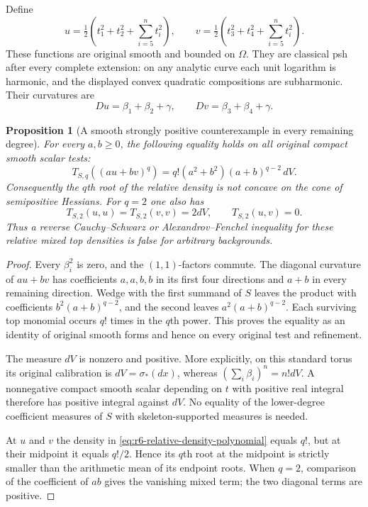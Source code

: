 \documentclass[11pt,a4paper]{article}
\numberwithin{equation}{section}
\newtheorem{proposition}[theorem]{Proposition}
\theoremstyle{definition}
\theoremstyle{remark}
\begin{document}
Define
\[
 u=\tfrac12(t_1^2+t_2^2+\sum_{i=5}^nt_i^2),\qquad
 v=\tfrac12(t_3^2+t_4^2+\sum_{i=5}^nt_i^2).
\]
These functions are original smooth and bounded on $\Omega$. They are
classical psh after every complete extension: on any analytic curve
each unit logarithm is harmonic, and the displayed convex quadratic
compositions are subharmonic. Their curvatures are
\[
                    Du=\beta_1+\beta_2+\gamma,
       \qquad Dv=\beta_3+\beta_4+\gamma.
\]

\begin{proposition}[A smooth strongly positive counterexample in every remaining degree]
\label{prop:r6-relative-root-concavity-false}
For every $a,b\ge0$, the following equality holds on all original
compact smooth scalar tests:
\begin{equation}
 T_{S,q}((au+bv)^q)
       =q!(a^2+b^2)(a+b)^{q-2}\,dV.
 \label{eq:r6-relative-density-polynomial}
\end{equation}
Consequently the $q$th root of the relative density is not concave on
the cone of semipositive Hessians. For $q=2$ one also has
\[
        T_{S,2}(u,u)=T_{S,2}(v,v)=2dV,
                  \qquad T_{S,2}(u,v)=0.
\]
Thus a reverse Cauchy--Schwarz or Alexandrov--Fenchel inequality for
these relative mixed top densities is false for arbitrary backgrounds.
\end{proposition}

\begin{proof}
Every $\beta_i^2$ is zero, and the $(1,1)$-factors commute. The
diagonal curvature of $au+bv$ has coefficients $a,a,b,b$ in its first
four directions and $a+b$ in every remaining direction. Wedge with the
first summand of $S$ leaves the product with coefficients
$b^2(a+b)^{q-2}$, and the second leaves
$a^2(a+b)^{q-2}$. Each surviving top monomial occurs $q!$ times in
the $q$th power. This proves the equality as an identity of original
smooth forms and hence on every original test and refinement.

The measure $dV$ is nonzero and positive. More explicitly, on this
standard torus its original calibration is $dV=\sigma_*(dx)$, whereas
$(\sum_i\beta_i)^n=n!dV$. A nonnegative compact smooth scalar depending
on $t$ with positive real integral therefore has positive integral
against $dV$. No equality of the lower-degree coefficient measures of
$S$ with skeleton-supported measures is needed.

At $u$ and $v$ the density in \eqref{eq:r6-relative-density-polynomial}
equals $q!$, but at their midpoint it equals $q!/2$. Hence its $q$th
root at the midpoint is strictly smaller than the arithmetic mean of
its endpoint roots. When $q=2$, comparison of the coefficient of $ab$
gives the vanishing mixed term; the two diagonal terms are positive.
\end{proof}
\end{document}
